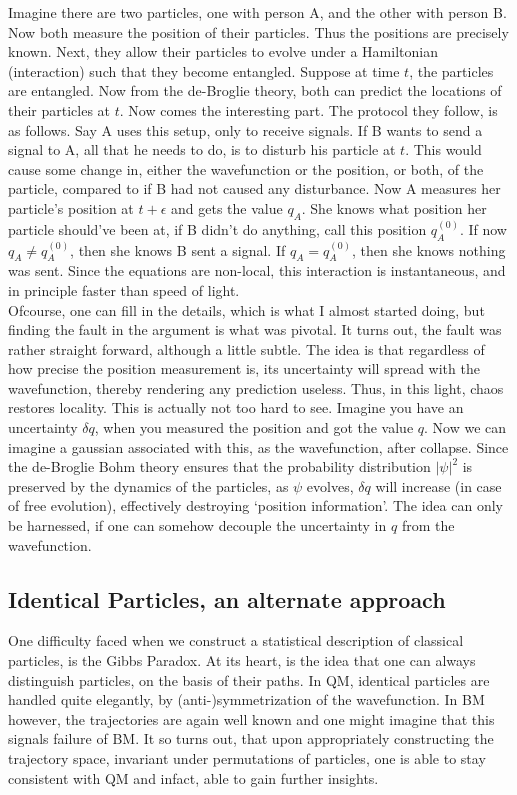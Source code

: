 Imagine there are two particles, one with person A, and the other
with person B. Now both measure the position of their particles. Thus
the positions are precisely known. Next, they allow their particles
to evolve under a Hamiltonian (interaction) such that they become
entangled. Suppose at time $t$, the particles are entangled. Now
from the de-Broglie theory, both can predict the locations of their
particles at $t$. Now comes the interesting part. The protocol they
follow, is as follows. Say A uses this setup, only to receive signals.
If B wants to send a signal to A, all that he needs to do, is to disturb
his particle at $t$. This would cause some change in, either the
wavefunction or the position, or both, of the particle, compared to
if B had not caused any disturbance. Now A measures her particle's
position at $t+\epsilon$ and gets the value $q_{A}$. She knows what
position her particle should've been at, if B didn't do anything,
call this position $q_{A}^{(0)}$. If now $q_{A}\neq q_{A}^{(0)}$,
then she knows B sent a signal. If $q_{A}=q_{A}^{(0)}$, then she
knows nothing was sent. Since the equations are non-local, this interaction
is instantaneous, and in principle faster than speed of light.\\
Ofcourse, one can fill in the details, which is what I almost started
doing, but finding the fault in the argument is what was pivotal.
It turns out, the fault was rather straight forward, although a little
subtle. The idea is that regardless of how precise the position measurement
is, its uncertainty will spread with the wavefunction, thereby rendering
any prediction useless. Thus, in this light, chaos restores locality.
This is actually not too hard to see. Imagine you have an uncertainty
$\delta q$, when you measured the position and got the value $q$.
Now we can imagine a gaussian associated with this, as the wavefunction,
after collapse. Since the de-Broglie Bohm theory ensures that the
probability distribution $\left|\psi\right|^{2}$ is preserved by
the dynamics of the particles, as $\psi$ evolves, $\delta q$ will
increase (in case of free evolution), effectively destroying `position
information'. The idea can only be harnessed, if one can somehow decouple
the uncertainty in $q$ from the wavefunction.


\subsection{Identical Particles, an alternate approach}

One difficulty faced when we construct a statistical description of
classical particles, is the Gibbs Paradox. At its heart, is the idea
that one can always distinguish particles, on the basis of their paths.
In QM, identical particles are handled quite elegantly, by (anti-)symmetrization
of the wavefunction. In BM however, the trajectories are again well
known and one might imagine that this signals failure of BM. It so
turns out, that upon appropriately constructing the trajectory space,
invariant under permutations of particles, one is able to stay consistent
with QM and infact, able to gain further insights. 

